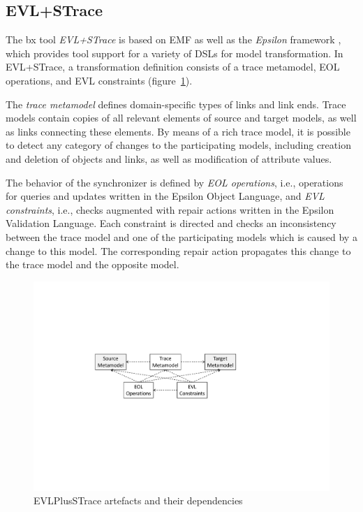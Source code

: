 \subsection{EVL+STrace}
\label{sec:EVLPlusSTrace}


The bx tool \emph{EVL+STrace} \cite{IST2018-Samimi} is based on EMF as well as the \emph{Epsilon} framework \cite{epsilon}, which provides tool support for a variety of DSLs for model transformation.
In EVL+STrace, a transformation definition consists of a trace metamodel, EOL operations, and EVL constraints (figure~\ref{fig:evlartefacts}).

The \emph{trace metamodel} defines domain-specific types of links and link ends.
Trace models contain copies of all relevant elements of source and target models, as well as links connecting these elements.
By means of a rich trace model, it is possible to detect any category of changes to the participating models, including creation and deletion of objects and links, as well as modification of attribute values.

The behavior of the synchronizer is defined by \emph{EOL operations}, i.e., operations for queries and updates written in the Epsilon Object Language, and \emph{EVL constraints}, i.e., checks augmented with repair actions written in the Epsilon Validation Language.
Each constraint is directed and checks an inconsistency between the trace model and one of the participating models which is caused by a change to this model.
The corresponding repair action propagates this change to the trace model and the opposite model.

\begin{figure}[tb!]
	\centering
	\includegraphics[width=0.8\columnwidth]{diagrams/solutions/EVLPlusSTraceArtefacts}
	\caption{EVLPlusSTrace artefacts and their dependencies}
	\label{fig:evlartefacts}
\end{figure}

